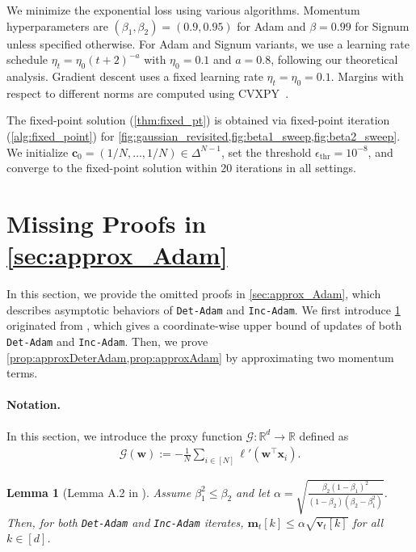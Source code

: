 \documentclass{article} %
\theoremstyle{plain}
\newtheorem{lemma}[theorem]{Lemma}
\theoremstyle{definition}
\theoremstyle{remark}
\def\gG{{\mathcal{G}}}
\def\bm{{\mathbf m}}
\def\bx{{\mathbf x}}
\def\bc{{\mathbf c}}
\def\bw{{\mathbf w}}
\def\bv{{\mathbf v}}
\begin{document}
We minimize the exponential loss using various algorithms. Momentum hyperparameters are $(\beta_1, \beta_2) = (0.9, 0.95)$ for Adam and $\beta = 0.99$ for Signum unless specified otherwise. For Adam and Signum variants, we use a learning rate schedule $\eta_t = \eta_0 (t+2)^{-a}$ with $\eta_0 = 0.1$ and $a = 0.8$, following our theoretical analysis. Gradient descent uses a fixed learning rate $\eta_t = \eta_0 = 0.1$. Margins with respect to different norms are computed using CVXPY~\citep{diamond2016cvxpy}.

The fixed-point solution (\cref{thm:fixed_pt}) is obtained via fixed-point iteration (\cref{alg:fixed_point}) for \cref{fig:gaussian_revisited,fig:beta1_sweep,fig:beta2_sweep}. We initialize $\bc_0 = (1/N, \dots, 1/N) \in \Delta^{N-1}$, set the threshold $\epsilon_{\textrm{thr}} = 10^{-8}$, and converge to the fixed-point solution within 20 iterations in all settings.

\newpage
\section[Missing Proofs in Section \ref{sec:approx_Adam}]{Missing Proofs in \cref{sec:approx_Adam}} \label{appendix:approx_Adam}
In this section, we provide the omitted proofs in \cref{sec:approx_Adam}, which describes asymptotic behaviors of \texttt{Det-Adam} and \texttt{Inc-Adam}. We first introduce \cref{lemma:update_bound} originated from \citet[Lemma A.2]{zou2023understanding}, which gives a coordinate-wise upper bound of updates of both \texttt{Det-Adam} and \texttt{Inc-Adam}. Then, we prove \cref{prop:approxDeterAdam,prop:approxAdam} by approximating two momentum terms.

\paragraph{Notation.}
In this section, we introduce the proxy function $\gG: \mathbb R^d \to \mathbb R$ defined as
\begin{align*}
    \gG(\bw) := -\frac{1}{N} \sum_{i \in [N]} \ell'(\bw^\top \bx_i).
\end{align*}

\begin{lemma}[Lemma A.2 in \citet{zou2023understanding}]\label{lemma:update_bound}
    Assume $\beta_1^2 \leq \beta_2$ and let $\alpha = \sqrt{\frac{\beta_2(1-\beta_1)^2}{(1-\beta_2)(\beta_2-\beta_1^2)}}$. Then, for both \textnormal{\texttt{Det-Adam}} and \textnormal{\texttt{Inc-Adam}} iterates, $\bm_t[k] \leq \alpha \sqrt{\bv_t[k]}$ for all $k \in [d]$.
\end{lemma}
\end{document}
